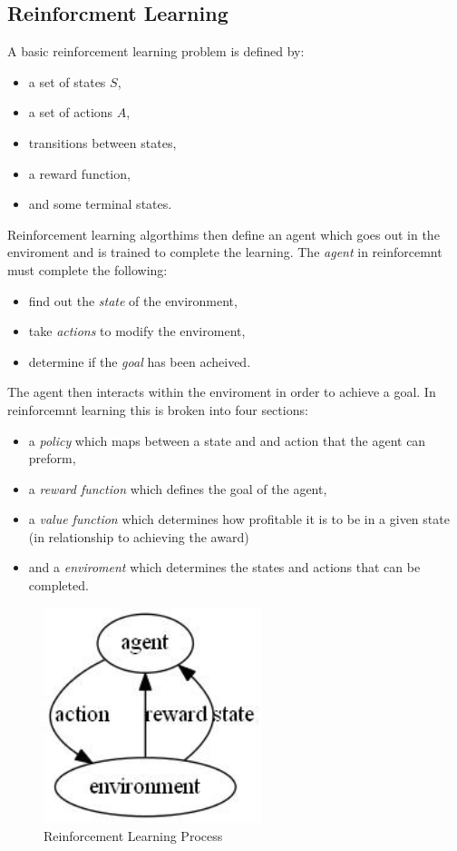 \documentclass[conference]{IEEEtran}
\begin{document}
\subsection{Reinforcment Learning}
A basic reinforcement learning problem is defined by:
\begin{itemize}
    \item a set of states $S$,
    \item a set of actions $A$,
    \item transitions between states,
    \item a reward function,
    \item and some terminal states.
\end{itemize}
Reinforcement learning algorthims then define an agent which goes out in the enviroment and is trained to complete the learning. 
The \emph{agent} in reinforcemnt must complete the following:
\begin{itemize}
	\item find out the \emph{state} of the environment,
	\item take \emph{actions} to modify the enviroment,
	\item determine if the \emph{goal} has been acheived.
\end{itemize}
The agent then interacts within the enviroment in order to achieve a goal.  In reinforcemnt learning this is broken into four sections:
\begin{itemize}
	\item a \emph{policy} which maps between a state and and action that the agent can preform,
	\item a \emph{reward function} which defines the goal of the agent,
	\item a \emph{value function} which determines how profitable it is to be in a given state (in relationship to achieving the award)
	\item and a \emph{enviroment} which determines the states and actions that can be completed.
\end{itemize}

\begin{figure}
\centering
\includegraphics[width=2.5in]{RLDiagram}
\caption{Reinforcement Learning Process}
\label{RLDiagram}
\end{figure}
\end{document}

